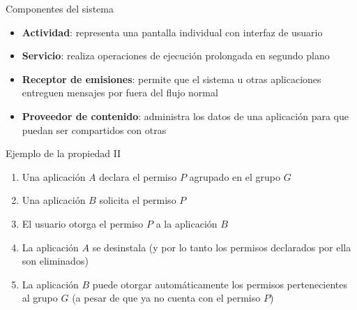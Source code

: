 \documentclass[pdf]{beamer} %
\begin{document}
\begin{frame}{Componentes del sistema}
    \begin{itemize}
        \item \textbf{Actividad}: representa una pantalla individual con interfaz de usuario
        \item \textbf{Servicio}: realiza operaciones de ejecución prolongada en segundo plano
        \item \textbf{Receptor de emisiones}: permite que el sistema u otras aplicaciones entreguen
              mensajes por fuera del flujo normal
        \item \textbf{Proveedor de contenido}: administra los datos de una aplicación para que
              puedan ser compartidos con otras
    \end{itemize}
\end{frame}

\begin{frame}{Ejemplo de la propiedad II}
    \begin{enumerate}[<+->]
        \item Una aplicación $A$ declara el permiso $P$ agrupado en el grupo $G$
        \item Una aplicación $B$ solicita el permiso $P$
        \item El usuario otorga el permiso $P$ a la aplicación $B$
        \item La aplicación $A$ se desinstala (y por lo tanto los permisos declarados por ella son
              eliminados)
        \item La aplicación $B$ puede otorgar automáticamente los permisos pertenecientes al grupo $G$
              (a pesar de que ya no cuenta con el permiso $P$)
    \end{enumerate}
\end{frame}
\end{document}
